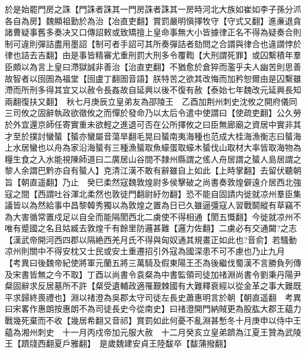 於是始罷門房之誅【門誅者誅其一門房誅者誅其一房時河北大族如崔如李子孫分沠各自為房】魏顯祖勤於為治【冶直吏翻】賞罰嚴明愼擇牧守【守式又翻】進亷退貪諸曹疑事舊多奏决又口傳詔敕或致矯擅上皇命事無大小皆據律正名不得為疑奏合則制可違則彈詰盡用墨詔【制可者手詔可其所奏彈詰者劾問之合謂與律合也違謂悖於律也詰去吉翻】由是事皆精審尤重刑罰大刑多令覆鞫【大刑謂死罪】或囚繫積年羣臣頗以為言上皇曰滯獄誠非善治【治直吏翻】不猶愈於倉猝而濫乎夫人幽苦則思善故智者以囹圄為福堂【囹盧丁翻圄音語】朕特苦之欲其改悔而加矜恕爾由是囚繫雖滯而所刑多得其宜又以赦令長姦故自延興以後不復有赦【泰始七年魏改元延興長知兩翻復扶又翻】　秋七月庚辰立皇弟友為邵陵王　乙酉加荆州刺史沈攸之開府儀同三司攸之固辭執政欲徵攸之而憚於發命乃以太后令遣中使謂曰【使疏吏翻】公久勞於外宜還京師任寄實重未欲輕之進退可否在公所擇攸之曰臣無廊廟之資居中實非其才至於撲討蠻蜑【蜑亦蠻屬音蕩旱翻毛晃曰蜑南夷海種也范成大桂海漁衡志曰蜑海上水居蠻也以舟為家沿海蜑有三種漁蜑取魚蠔蛋取蠔木蜑伐山取材大率皆取海物為糧生食之入水能視陳師道曰二廣居山谷間不隸州縣謂之傜人舟居謂之蜑人島居謂之黎人余謂巴黔亦自有蜑人】克清江漢不敢有辭雖自上如此【上時掌翻】去留伏聽朝旨【朝直遥翻】乃止　癸巳柔然寇魏敦煌尉多侯擊破之尚書奏敦煌僻遠介居西北強寇之間【西謂吐谷渾北柔然也敦徒門翻尉紆勿翻】恐不能自固請内徙就凉州羣臣集議皆以為然給事中昌黎韓秀獨以為敦煌之置為日已久雖逼彊寇人習戰鬬縱有草竊不為大害循常置戍足以自全而能隔閡西北二虜使不得相通【閡五慨翻】今徙就凉州不唯有蹙國之名且姑臧去敦煌千有餘里防邏甚難【邏力佐翻】二虜必有交通闚?之志【漢武帝開河西四郡以隔絶西羌月氏不得與匈奴通其規畫正如此也?音俞】若騷動凉州則關中不得安枕又士民或安土重遷招引外寇為國深患不可不慮也乃止九月　【考異曰後魏帝紀使將軍元蘭五將三萬騎及假東陽王丕為後繼伐蜀漢不言勝負列傳及宋書皆無之今不取】丁酉以尚書令袁粲為中書監領司徒加禇淵尚書令劉秉丹陽尹粲固辭求反居墓所不許【粲受遺輔政適罹艱棘國有大難釋衰經以從金革之事大難既平求歸終喪禮也】淵以禇澄為吳郡太守司徒左長史蕭惠明言於朝【朝直遥翻　考異曰宋畧作惠朗按惠朗不為司徒長史今從南史】曰禇澄開門納賊更為股肱大郡王藴力戰幾死棄而不收【幾居希翻又音祁】賞罰如此何憂不亂淵甚慙冬十月庚申以侍中王藴為湘州刺史　十一月丙戍帝加元服大赦　十二月癸亥立皇弟躋為江夏王贊為武陵王【躋牋西翻夏戶雅翻】　是歲魏建安貞王陸馛卒【馛蒲撥翻】

